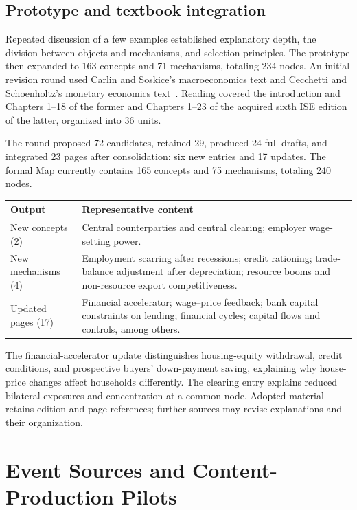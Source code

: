 \documentclass[11pt,letterpaper]{article}
\begin{document}
\subsection{Prototype and textbook integration}

Repeated discussion of a few examples established explanatory depth, the division between objects and mechanisms, and selection principles. The prototype then expanded to 163 concepts and 71 mechanisms, totaling 234 nodes. An initial revision round used Carlin and Soskice's macroeconomics text and Cecchetti and Schoenholtz's monetary economics text~\cite{carlin,cecchetti}. Reading covered the introduction and Chapters 1--18 of the former and Chapters 1--23 of the acquired sixth ISE edition of the latter, organized into 36 units.

The round proposed 72 candidates, retained 29, produced 24 full drafts, and integrated 23 pages after consolidation: six new entries and 17 updates. The formal Map currently contains 165 concepts and 75 mechanisms, totaling 240 nodes.

\begin{center}
\small
\begin{tabularx}{\textwidth}{@{}L{0.20\textwidth}Y@{}}
\toprule
Output & Representative content \\
\midrule
New concepts (2) & Central counterparties and central clearing; employer wage-setting power. \\
New mechanisms (4) & Employment scarring after recessions; credit rationing; trade-balance adjustment after depreciation; resource booms and non-resource export competitiveness. \\
Updated pages (17) & Financial accelerator; wage--price feedback; bank capital constraints on lending; financial cycles; capital flows and controls, among others. \\
\bottomrule
\end{tabularx}
\end{center}

The financial-accelerator update distinguishes housing-equity withdrawal, credit conditions, and prospective buyers' down-payment saving, explaining why house-price changes affect households differently. The clearing entry explains reduced bilateral exposures and concentration at a common node. Adopted material retains edition and page references; further sources may revise explanations and their organization.

\newpage
\section{Event Sources and Content-Production Pilots}
\end{document}
